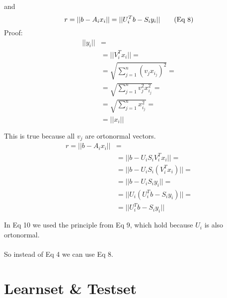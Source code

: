 \documentclass{article}
\begin{document}
	and
	\[
		r = ||b - A_ix_i|| = ||U_i^Tb - S_iy_i||  \tag{Eq 8}\\
	\]
	Proof:
	\begin{align*}
		||y_i|| &= \\
			&=  ||V_i^Tx_i|| = \\
		 	&= \sqrt{\sum_{j=1}^{n} (v_jx_{i_j})^2} =  \\
			&= \sqrt{\sum_{j=1}^{n} v_j^2x_{i_j}^2} =	 \\
			&= \sqrt{\sum_{j=1}^{n} x_{i_j}^2} = \\
			&= ||x_i|| \\
			\tag{Eq 9}\\
	\end{align*}
	This is true because all  $v_j$ are ortonormal vectors. \\
	\begin{align*}
		r = ||b - A_ix_i|| &= \\
			&=  ||b - U_iS_iV_i^Tx_i|| = \\
		 	&= ||b - U_iS_i(V_i^Tx_i)|| =  \\
			&= ||b - U_iS_iy_i|| =	 \\
			&= ||U_i(U_i^Tb - S_iy_i)|| = \\
			&= ||U_i^Tb - S_iy_i|| \\
			\tag{Eq 10}\\
	\end{align*}
	In Eq 10 we used the principle from Eq 9, which hold because $U_i$ is also ortonormal. \\
	\\
	So instead of Eq 4 we can use Eq 8.
	
	\section{Learnset \& Testset}
\end{document}
